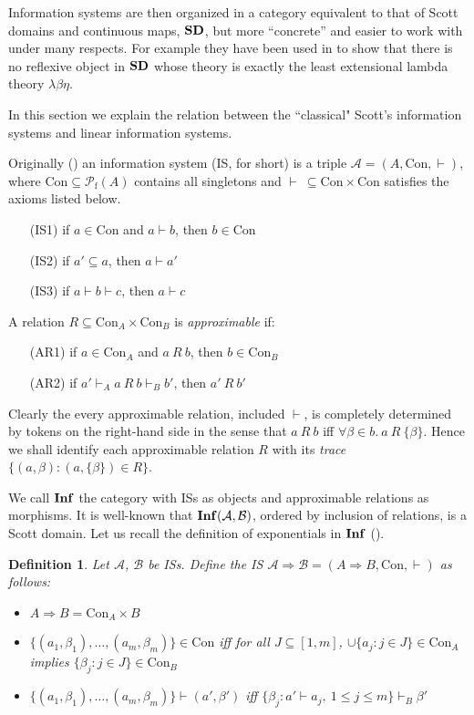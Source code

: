 \documentclass[copyright,creativecommons]{eptcs}
\newtheorem{definition}[theorem]{Definition}
\newcommand{\cA}{\mathcal{A}}
\newcommand{\cB}{\mathcal{B}}
\newcommand{\cP}{\mathcal{P}}
\newcommand{\gb}{\beta}
\newcommand{\gl}{\lambda}
\newcommand{\rf}{\mathrm{f}}
\newcommand{\Con}{\mathrm{Con}} \newcommand{\Com}{\mathrm{Com}} \newcommand{\Sup}{\mathrm{Sup}} %
\begin{document}
Information systems are then organized in a category equivalent to that of Scott domains and continuous maps, $\mathbf{SD}$, but more ``concrete'' and easier to work with under many respects. For example they have been used in \cite{Salibra09} to show that there is no reflexive object in $\mathbf{SD}$ whose theory is exactly the least extensional lambda theory $\gl\gb\eta$.

In this section we explain the relation between the ``classical" Scott's information systems and linear information systems.

\newpage

Originally (\cite{Scott82}) an information system (IS, for short) is a triple $\cA= (A, \Con, \vdash)$, where \mbox{$\Con \subseteq \cP_\rf(A)$} contains all singletons and $\vdash \ \subseteq \Con \times \Con$ satisfies the axioms listed below.
\begin{itemize}
\item[(IS1)] if $a \in \Con$ and $a \vdash b$, then $b \in \Con$
\item[(IS2)] if $a' \subseteq a$, then $a \vdash a'$
\item[(IS3)] if $a \vdash b \vdash c$, then $a \vdash c$
\end{itemize}

\medskip

A relation $R \subseteq \Con_A \times \Con_B$ is \emph{approximable} if:
\begin{itemize}
\item[(AR1)] if $a \in \Con_A$ and $a \ R \ b$, then $b \in \Con_B$
\item[(AR2)] if $a' \vdash_A a \ R \ b \vdash_B b'$, then $a'\ R\ b'$
\end{itemize}

Clearly the every approximable relation, included $\vdash$, is completely determined by tokens on the right-hand side in the sense that $a \ R \ b$ iff $\forall \beta \in b.\ a \ R \ \{\beta\}$. Hence we shall identify each approximable relation $R$ with its \emph{trace} $\{(a, \beta) : (a, \{\beta\}) \in R \}$.

\medskip

We call $\mathbf{Inf}$ the category with ISs as objects and approximable relations as morphisms. It is well-known that $\Inf(\cA, \cB)$, ordered by inclusion of relations, is a Scott domain. Let us recall the definition of exponentials in $\mathbf{Inf}$ (\cite{Larsen91}).

\begin{definition}
Let $\cA$, $\cB$ be ISs. Define the IS $\cA \Rightarrow \cB = (A \Rightarrow B, \Con, \vdash)$ as follows:
\begin{itemize}
\item $A \Rightarrow B = \Con_A \times B$
\item $\{(a_1, \beta_1), \ldots, (a_m, \beta_m)\} \in \Con$ iff for all $J \subseteq [1,m]$, $\cup \{a_j : j \in J\} \in \Con_A$ implies $\{\beta_j : j \in J\} \in \Con_B$
\item $\{(a_1, \beta_1), \ldots, (a_m,\beta_m)\} \vdash (a', \beta')$ iff $\{\beta_j : a' \vdash a_j,\ 1 \leq j \leq m \} \vdash_B \beta'$
\end{itemize}
\end{definition}
\end{document}
